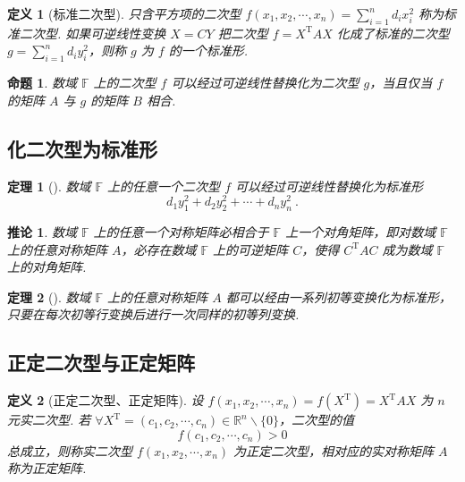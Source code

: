 \documentclass[zihao=-4,UTF8,linespread=1.8,nothm]{aytony_base}
\newtheorem{theorem}{\indent 定理}[subsection]
\newtheorem{proposition}{\indent 命题}[subsection]
\newtheorem*{corollary}{\indent 推论}
\newtheorem{definition}{\indent 定义}[subsection]
\begin{document}
\begin{definition}[标准二次型]
    只含平方项的二次型 $f({x}_1, {x}_2, \cdots, {x}_{n}) = \sum\limits_{i = 1}^{n}d_ix_i^2$ 称为标准二次型. 如果可逆线性变换 $X = CY$ 把二次型 $f = X ^{\mathrm{T}}AX$ 化成了标准的二次型 $g = \sum\limits_{i = 1}^{n}d_iy_i^2$，则称 $g$ 为 $f$ 的一个标准形.
\end{definition}

\begin{proposition}
    数域 $\mathbb{F}$ 上的二次型 $f$ 可以经过可逆线性替换化为二次型 $g$，当且仅当 $f$ 的矩阵 $A$ 与 $g$ 的矩阵 $B$ 相合.
\end{proposition}

\subsection{化二次型为标准形}

\begin{theorem}[]
    数域 $\mathbb{F}$ 上的任意一个二次型 $f$ 可以经过可逆线性替换化为标准形 $$
        d_1y_1^2 + d_2y_2^2 + \cdots + d_ny_n^2\ .
    $$
\end{theorem}

\begin{corollary}
    数域 $\mathbb{F}$ 上的任意一个对称矩阵必相合于 $\mathbb{F}$ 上一个对角矩阵，即对数域 $\mathbb{F}$ 上的任意对称矩阵 $A$，必存在数域 $\mathbb{F}$ 上的可逆矩阵 $C$，使得 $C ^{\mathrm{T}} AC$ 成为数域 $\mathbb{F}$ 上的对角矩阵.
\end{corollary}

\begin{theorem}[]
    数域 $\mathbb{F}$ 上的任意对称矩阵 $A$ 都可以经由一系列初等变换化为标准形，只要在每次初等行变换后进行一次同样的初等列变换.
\end{theorem}

\subsection{正定二次型与正定矩阵}

\begin{definition}[正定二次型、正定矩阵]
    设 $f({x}_1, {x}_2, \cdots, {x}_{n})=f(X ^{\mathrm{T}}) = X ^{\mathrm{T}}AX$ 为 $n$ 元实二次型. 若 $\forall X ^{\mathrm{T}} = ({c}_1, {c}_2, \cdots, {c}_{n}) \in \mathbb{R}^n\backslash\{0\}$，二次型的值 $$
        f({c}_1, {c}_2, \cdots, {c}_{n}) > 0
    $$ 总成立，则称实二次型 $f({x}_1, {x}_2, \cdots, {x}_{n})$ 为正定二次型，相对应的实对称矩阵 $A$ 称为正定矩阵.
\end{definition}
\end{document}
